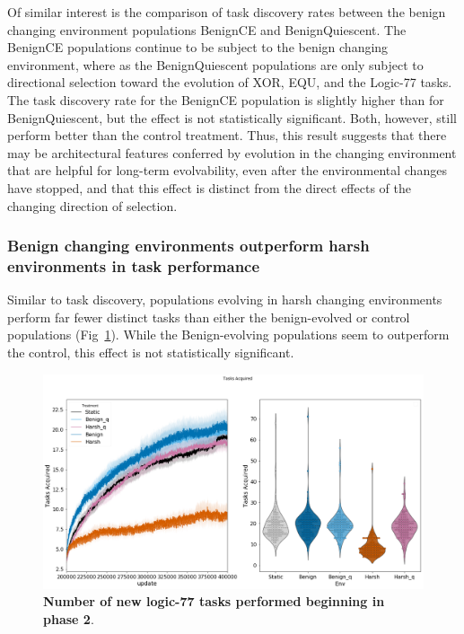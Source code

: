 \documentclass[PhD]{msu-thesis}
\begin{document}
Of similar interest
is the comparison of task discovery rates between the benign changing environment populations BenignCE and BenignQuiescent. The BenignCE populations continue to be subject to the benign changing environment, where as the BenignQuiescent populations are only subject to directional selection toward the evolution of XOR, EQU, and the Logic-77 tasks. The task discovery rate for the BenignCE population is slightly higher than for BenignQuiescent, but the effect is not statistically significant. Both, however, still perform better than the control treatment. Thus, this result suggests that there may be architectural features conferred by evolution in the changing environment that are helpful for long-term evolvability, even after the environmental changes have stopped, and that this effect is distinct from the direct effects of the changing direction of selection. %

 

\subsubsection{Benign changing environments outperform harsh environments in task performance}
Similar to task discovery, populations evolving in harsh changing environments perform far fewer distinct tasks than either the benign-evolved or control populations (Fig~\ref{fig:lte-task_performance}). While the Benign-evolving
populations seem to outperform the control, this effect is not statistically significant. 

	\begin{figure}[!h]
	\includegraphics[trim={0 0 0 0}, clip, width=0.75\columnwidth]{figures/LTE/lte-simple-post_reward_task_performance.png}
	\caption{\textbf{Number of new logic-77 tasks performed beginning in phase 2}.%
	}
	\label{fig:lte-task_performance}
	\end{figure}  
\end{document}
